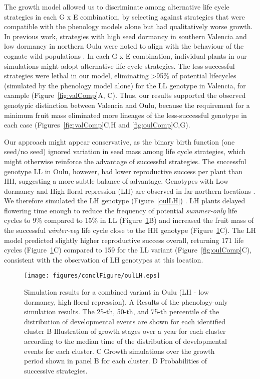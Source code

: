 The growth model allowed us to discriminate among alternative life cycle
strategies in each G x E combination, by selecting against strategies that were
compatible with the phenology models alone but had qualitatively worse
growth. In previous work, strategies with high seed dormancy in southern
Valencia and low dormancy in northern Oulu were noted to align with the
behaviour of the cognate wild populations \citep{atwell_genome-wide_2010,
  chiang_dog1_2011, mendez-vigo_altitudinal_2011, burghardt_data_2014}. In each
G x E combination, individual plants in our simulations might adopt alternative
life cycle strategies. The less-successful strategies were lethal in our model,
eliminating \textgreater{}95\% of potential lifecycles (simulated by the
phenology model alone) for the LL genotype in Valencia, for example
(Figure~\ref{fig:valComp}A, C). Thus, our results supported the observed
genotypic distinction between Valencia and Oulu, because the requirement for a
minimum fruit mass eliminated more lineages of the less-successful genotype in
each case (Figures~\ref{fig:valComp}C,H and \ref{fig:oulComp}C,G).

Our approach might appear conservative, as the binary birth function (one
seed/no seed) ignored variation in seed mass among life cycle strategies, which
might otherwise reinforce the advantage of successful strategies. The successful
genotype LL in Oulu, however, had lower reproductive success per plant than HH,
suggesting a more subtle balance of advantage. Genotypes with Low dormancy and
High floral repression (LH) are observed in far northern locations
\citep{atwell_genome-wide_2010}. We therefore simulated the LH genotype (Figure~\ref{oulLH})
. LH plants delayed flowering time enough to reduce the frequency of potential
\emph{summer-only} life cycles to 9\% compared to 15\% in LL
(Figure~\ref{fig:oulLH}B) and increased the fruit mass of the successful
\emph{winter-veg} life cycle close to the HH genotype
(Figure~\ref{fig:oulLH}C). The LH model predicted slightly higher reproductive
success overall, returning 171 life cycles (Figure~\ref{fig:oulLH}C) compared to
159 for the LL variant (Figure~\ref{fig:oulComp}C), consistent with the
observation of LH genotypes at this location.

\begin{figure}[tb]
\centering
\texttt{[image: figures/conclFigure/oulLH.eps]}
\caption{Simulation results for a combined variant in Oulu (LH - low dormancy,
  high floral repression). A Results of the phenology-only simulation
  results. The 25-th, 50-th, and 75-th percentile of the distribution of
  developmental events are shown for each identified cluster B Illustration of
  growth stages over a year for each cluster according to the median time of the
  distribution of developmental events for each cluster. C Growth simulations
  over the growth period shown in panel B for each cluster.  D Probabilities of
  successive strategies.}
\label{fig:oulLH}
\end{figure}

